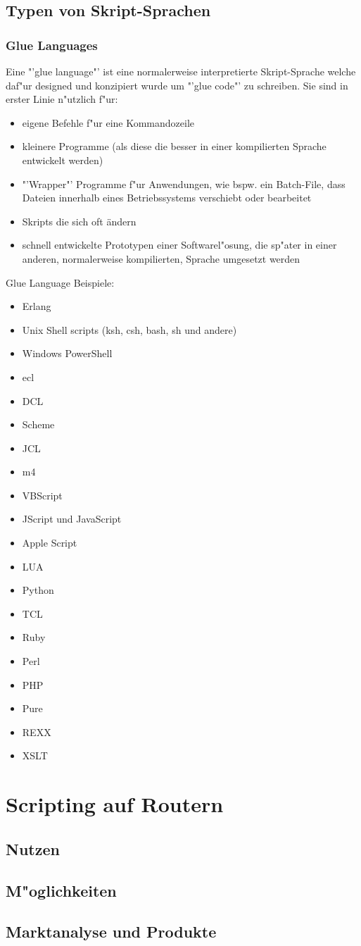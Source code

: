 \documentclass[a4paper,12pt]{scrreprt}
\begin{document}
\section{Typen von Skript-Sprachen}
\subsection{Glue Languages}
Eine "'glue language"' ist eine normalerweise interpretierte Skript-Sprache welche daf"ur designed und konzipiert wurde um "'glue code"' zu schreiben. Sie sind in erster Linie n"utzlich f"ur:
\begin{itemize}
\item eigene Befehle f"ur eine Kommandozeile
\item kleinere Programme (als diese die besser in einer kompilierten Sprache entwickelt werden)
\item "'Wrapper"' Programme f"ur Anwendungen, wie bspw. ein Batch-File, dass Dateien innerhalb eines Betriebssystems verschiebt oder bearbeitet
\item Skripts die sich oft ändern
\item schnell entwickelte Prototypen einer Softwarel"osung, die sp"ater in einer anderen, normalerweise kompilierten, Sprache umgesetzt werden
\end{itemize}
Glue Language Beispiele:

\begin{itemize}
\item Erlang
\item Unix Shell scripts (ksh, csh, bash, sh und andere)
\item Windows PowerShell
\item ecl
\item DCL
\item Scheme
\item JCL
\item m4
\item VBScript
\item JScript und JavaScript
\item Apple Script
\item LUA
\item Python
\item TCL
\item Ruby
\item Perl
\item PHP
\item Pure
\item REXX
\item XSLT
\end{itemize}

\chapter{Scripting auf Routern}
\section{Nutzen}

\section{M"oglichkeiten}
	
\section{Marktanalyse und Produkte}
	

\end{document}

